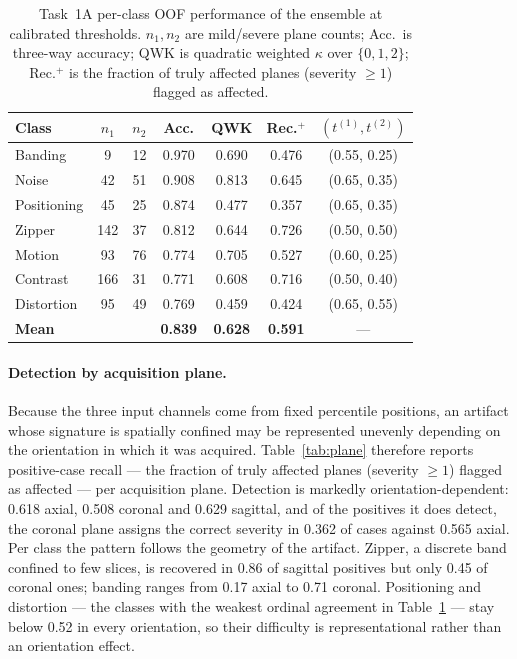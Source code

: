 \documentclass[runningheads]{llncs}
\begin{document}
\begin{table}[htbp]
\caption{Task~1A per-class OOF performance of the ensemble at calibrated
thresholds. $n_1,n_2$ are mild/severe plane counts; Acc.\ is three-way accuracy;
QWK is quadratic weighted $\kappa$ over $\{0,1,2\}$; Rec.$^{+}$ is the fraction of
truly affected planes (severity $\ge1$) flagged as affected.}
\label{tab:perclass}
\centering
\setlength{\tabcolsep}{5pt}
\begin{tabular}{lcccccc}
\toprule
Class & $n_1$ & $n_2$ & Acc. & QWK & Rec.$^{+}$ & $(t^{(1)}, t^{(2)})$ \\
\midrule
Banding     &   9 & 12 & 0.970 & 0.690 & 0.476 & (0.55, 0.25) \\
Noise       &  42 & 51 & 0.908 & 0.813 & 0.645 & (0.65, 0.35) \\
Positioning &  45 & 25 & 0.874 & 0.477 & 0.357 & (0.65, 0.35) \\
Zipper      & 142 & 37 & 0.812 & 0.644 & 0.726 & (0.50, 0.50) \\
Motion      &  93 & 76 & 0.774 & 0.705 & 0.527 & (0.60, 0.25) \\
Contrast    & 166 & 31 & 0.771 & 0.608 & 0.716 & (0.50, 0.40) \\
Distortion  &  95 & 49 & 0.769 & 0.459 & 0.424 & (0.65, 0.55) \\
\midrule
\textbf{Mean} & & & \textbf{0.839} & \textbf{0.628} & \textbf{0.591} & --- \\
\bottomrule
\end{tabular}
\end{table}

\paragraph{Detection by acquisition plane.}
Because the three input channels come from fixed percentile positions, an artifact
whose signature is spatially confined may be represented unevenly depending on the
orientation in which it was acquired. Table~\ref{tab:plane} therefore reports
positive-case recall --- the fraction of truly affected planes (severity $\ge1$)
flagged as affected --- per acquisition plane. Detection is markedly
orientation-dependent: 0.618 axial, 0.508 coronal and 0.629 sagittal, and of the
positives it does detect, the coronal plane assigns the correct severity in 0.362 of
cases against 0.565 axial. Per class the pattern follows the geometry of the artifact.
Zipper, a discrete band confined to few slices, is recovered in 0.86 of sagittal
positives but only 0.45 of coronal ones; banding ranges from 0.17 axial to 0.71
coronal. Positioning and distortion --- the classes with the weakest ordinal agreement
in Table~\ref{tab:perclass} --- stay below 0.52 in every orientation, so their
difficulty is representational rather than an orientation effect.
\end{document}

